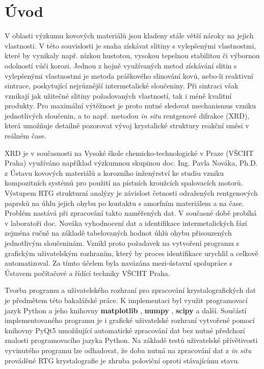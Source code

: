 \documentclass[a4paper, 12pt]{article}
\begin{document}
\newpage

\tableofcontents
\newpage

\section{Úvod}
V oblasti výzkumu kovových materiálů jsou kladeny stále větší nároky na jejich vlastnosti. V této souvislosti je snaha získávat slitiny s vylepšenými vlastnostmi, které by vynikaly např. nízkou hustotou, vysokou tepelnou stabilitou či výbornou odolností vůči korozi. \cite{NOVAK2009123} Jednou z hojně využívaných metod získávání slitin s vylepšenými vlastnostmi je metoda práškového slinování kovů, nebo-li reaktivní sintrace, poskytující nejrůznější intermetalické sloučeniny. \cite{novak2012pvriprava} Při sintraci však vznikají jak užitečné slitiny požadovaných vlastností, tak i méně kvalitní produkty. Pro maximální výtěžnost je proto nutné sledovat mechanismus vzniku jednotlivých sloučenin, a to např. metodou \textit{in situ} rentgenové difrakce (XRD), která umožňuje detailně pozorovat vývoj krystalické struktury reakční směsi v reálném čase. \cite{NOVAKxrd} \par

XRD je v současnosti na Vysoké škole chemicko-technologické v Praze (VŠCHT Praha) využíváno například výzkumnou skupinou doc. Ing. Pavla Nováka, Ph.D. z Ústavu kovových materiálů a korozního inženýrství ke studiu vzniku kompozitních systémů pro použití na pístních kroužcích spalovacích motorů. \cite{UKMKIvscht} Výstupem RTG strukturní analýzy je závislost četnosti odražených rentgenových paprsků na úhlu jejich ohybu po kontaktu s amorfním materiálem a na čase. \cite{XRD} Problém nastává při zpracování takto naměřených dat. V současné době probíhá v laboratoři doc. Nováka vyhodnocení dat a identifikace intermetalických fází zejména ručně na základě tabelovaných hodnot úhlů ohybu přisouzených jednotlivým sloučeninám. Vznikl proto požadavek na vytvoření programu s grafickým uživatelským rozhraním, který by proces identifikace urychlil a celkově automatizoval. Za tímto účelem byla navázána mezi-ústavní spolupráce s Ústavem počítačové a řídící techniky VŠCHT Praha. \par

Tvorba programu a uživatelského rozhraní pro zpracování krystalografických dat je předmětem této bakalářské práce. K implementaci byl využit programovací jazyk Python \cite{pythonorg} a jeho knihovny \textbf{matplotlib} \cite{PltLib}, \textbf{numpy} \cite{NPY}, \textbf{scipy}  \cite{SciOrg} a další. Součástí implementovaného programu je i grafické uživatelské rozhraní vytvořené pomocí knihovny PyQt5 \cite{PyQt} umožňující automatické zpracování dat bez nutné předchozí znalosti programovacího jazyka Python. Na základě testů uživatelské přívětivosti vyvinutého programu lze odhadovat, že doba nutná na zpracování dat z \textit{in situ} prováděné RTG krystalografie je zhruba poloviční oproti stávajícímu stavu.
\end{document}
